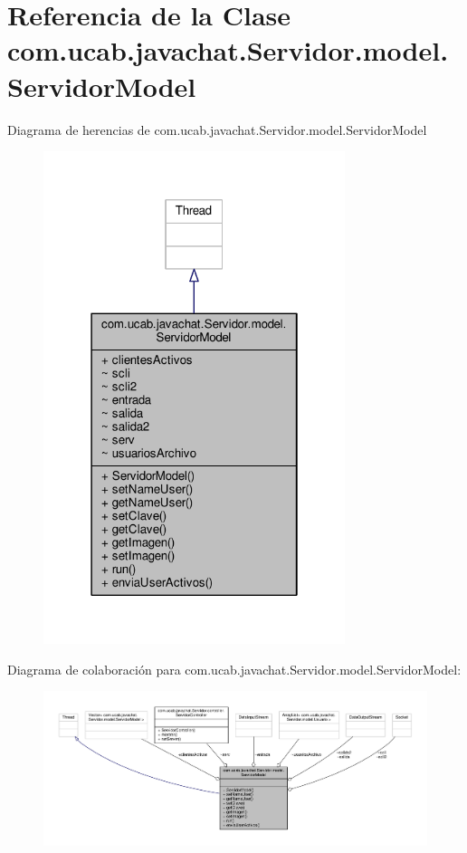 \hypertarget{classcom_1_1ucab_1_1javachat_1_1_servidor_1_1model_1_1_servidor_model}{\section{Referencia de la Clase com.\-ucab.\-javachat.\-Servidor.\-model.\-Servidor\-Model}
\label{classcom_1_1ucab_1_1javachat_1_1_servidor_1_1model_1_1_servidor_model}
}


Diagrama de herencias de com.\-ucab.\-javachat.\-Servidor.\-model.\-Servidor\-Model
\nopagebreak
\begin{figure}[H]
\begin{center}
\leavevmode
\includegraphics[width=250pt]{da/d11/classcom_1_1ucab_1_1javachat_1_1_servidor_1_1model_1_1_servidor_model__inherit__graph}
\end{center}
\end{figure}


Diagrama de colaboración para com.\-ucab.\-javachat.\-Servidor.\-model.\-Servidor\-Model\-:
\nopagebreak
\begin{figure}[H]
\begin{center}
\leavevmode
\includegraphics[width=350pt]{de/d22/classcom_1_1ucab_1_1javachat_1_1_servidor_1_1model_1_1_servidor_model__coll__graph}
\end{center}
\end{figure}
